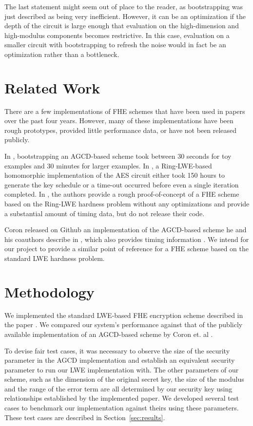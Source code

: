 \documentclass[letterpaper,twocolumn,10pt]{article}
\begin{document}
The last statement might seem out of place to the reader, as bootstrapping was just described as being very inefficient. However, it can be an optimization if the depth of the circuit is large enough that evaluation on the high-dimension and high-modulus components becomes restrictive. In this case, evaluation on a smaller circuit with bootstrapping to refresh the noise would in fact be an optimization rather than a bottleneck.


\section{Related Work}
There are a few implementations of FHE schemes that have been used in papers over the past four years. However, many of these implementations have been rough prototypes, provided little performance data, or have not been released publicly. 

In \cite{ImplementingGentry}, bootstrapping an AGCD-based scheme took between 30 seconds for toy examples and 30 minutes for larger examples. In \cite{AES}, a Ring-LWE-based homomorphic implementation of the AES circuit either took 150 hours to generate the key schedule or a time-out occurred before even a single iteration completed. In \cite{Practical}, the authors provide a rough proof-of-concept of a FHE scheme based on the Ring-LWE hardness problem without any optimizations and provide a substantial amount of timing data, but do not release their code.

Coron released on Github an implementation of the AGCD-based scheme he and his coauthors describe in \cite{CNT}, which also provides timing information \cite{Coron}. We intend for our project to provide a similar point of reference for a FHE scheme based on the standard LWE hardness problem.



\section{Methodology}
We implemented the standard LWE-based FHE encryption scheme described in the paper \cite{StandardLWE}. We compared our system's performance against that of the publicly available implementation of an AGCD-based scheme by Coron et. al \cite{Coron, CNT}.

To devise fair test cases, it was necessary to observe the size of the security parameter in the AGCD implementation and establish an equivalent security parameter to run our LWE implementation with. The other parameters of our scheme, such as the dimension of the original secret key, the size of the modulus and the range of the error term are all determined by our security key using relationships established by the implemented paper\cite{StandardLWE}. We developed several test cases to benchmark our implementation against theirs using these parameters. These test cases are described in Section~\ref{sec:results}.
\end{document}
